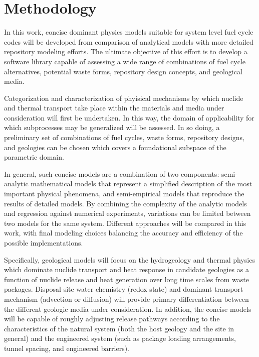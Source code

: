 \section{Methodology} 

In this work, concise dominant physics models suitable for system 
level fuel cycle codes will be developed from comparison of analytical 
models with more detailed repository modeling efforts. The ultimate 
objective of this effort is to develop a software library capable of 
assessing a wide range of combinations of fuel cycle alternatives, 
potential waste forms, repository design concepts, and geological 
media. 

Categorization and characterization of phyisical mechanisms by which 
nuclide and thermal transport take place within the materials and 
media under consideration will first be undertaken. In this way, the 
domain of applicability for which subprocesses may be generalized will 
be assessed. In so doing, a preliminary set of combinations of fuel 
cycles, waste forms, repository designs, and geologies can be chosen 
which covers a foundational subspace of the parametric domain. 

In general, such concise models are a combination of two components: 
semi-analytic mathematical models that represent a simplified 
description of the most important physical phenomena, and 
semi-empirical models that reproduce the results of detailed models.  
By combining the complexity of the analytic models and regression 
against numerical experiments, variations can be limited between two 
models for the same system.  Different approaches will be compared in 
this work, with final modeling choices balancing the accuracy and 
efficiency of the possible implementations.  

Specifically, geological models will focus on the hydrogeology and 
thermal physics which dominate nuclide transport and heat response in 
candidate geologies as a function of nuclide release and heat 
generation over long time scales from waste packages.  Disposal site 
water chemistry (redox state) and dominant transport mechanism 
(advection or diffusion) will provide primary differentiation between 
the different geologic media under consideration. In addition, the 
concise models will be capable of roughly adjusting release pathways 
according to the characteristics of the natural system (both the host 
geology and the site in general) and the engineered system (such as 
package loading arrangements, tunnel spacing, and engineered 
barriers).


